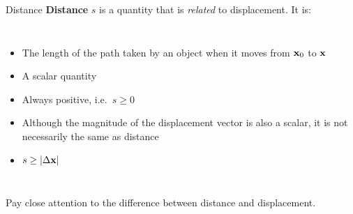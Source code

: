 \documentclass[12pt,compress,aspectratio=169]{beamer}
\newcommand{\mb}[1]{\ensuremath\mathbf{#1}}
\newcommand{\eq}[2]{\vspace{#1}{\Large\begin{displaymath}#2\end{displaymath}}}
\begin{document}
\begin{frame}{Distance}
  \textbf{Distance} $s$ is a quantity that is \emph{related} to displacement.
  It is:
  \begin{columns}
    \begin{itemize}
    \item The length of the path taken by an object when it moves from
      $\mb{x}_0$ to $\mb{x}$
    \item A scalar quantity
    \item Always positive, i.e.\ $s\geq 0$
    \item Although the magnitude of the displacement vector is also a scalar,
      it is not necessarily the same as distance
    \item $s\geq |\Delta\mb{x}|$
    \end{itemize}
    
  \end{columns}
  \vspace{.15in}Pay close attention to the difference between distance and displacement.
\end{frame}




%
%
%
%  
%  
%
\end{document}
